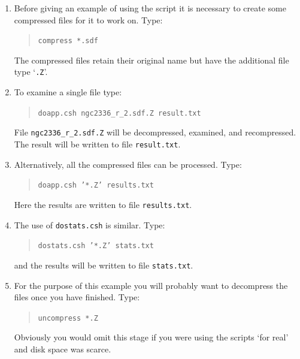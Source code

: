 \documentclass[twoside,11pt]{article}
\begin{document}
\begin{enumerate}

  \item Before giving an example of using the script it is necessary
   to create some compressed files for it to work on.  Type:

  \begin{quote}
   {\tt compress *.sdf}
  \end{quote}

   The compressed files retain their original name but have the additional
   file type `{\tt .Z}'.

  \item To examine a single file type:

  \begin{quote}
   {\tt doapp.csh ngc2336\_r\_2.sdf.Z result.txt}
  \end{quote}

   File {\tt ngc2336\_r\_2.sdf.Z} will be decompressed, examined, and
   recompressed.  The result will be written to file {\tt result.txt}.

  \item Alternatively, all the compressed files can be processed.  Type:

  \begin{quote}
   {\tt doapp.csh '*.Z' results.txt}
  \end{quote}

   Here the results are written to file {\tt results.txt}.

  \item The use of {\tt dostats.csh} is similar.  Type:

  \begin{quote}
   {\tt dostats.csh '*.Z' stats.txt}
  \end{quote}

   and the results will be written to file {\tt stats.txt}.

  \item For the purpose of this example you will probably want to
   decompress the files once you have finished.  Type:

  \begin{quote}
   {\tt uncompress *.Z}
  \end{quote}

   Obviously you would omit this stage if you were using the scripts
   `for real' and disk space was scarce.

\end{enumerate}
\end{document}
